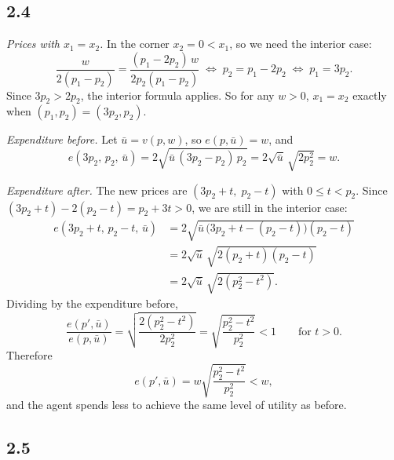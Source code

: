 \documentclass[12pt,letterpaper]{article}
\newif\ifshowhints
\newcommand{\hint}[1]{\ifshowhints{\color{blue}\small\textbf{Hint.} #1\par}\fi}
\begin{document}
\subsection*{2.4}

\textit{Prices with $x_1=x_2$.} In the corner $x_2=0<x_1$, so we need the interior case:
\[
\frac{w}{2(p_1-p_2)} = \frac{(p_1-2p_2)\,w}{2p_2(p_1-p_2)} \;\Longleftrightarrow\; p_2 = p_1-2p_2 \;\Longleftrightarrow\; p_1 = 3p_2 .
\]
Since $3p_2>2p_2$, the interior formula applies. So for any $w>0$, $x_1=x_2$ exactly when $(p_1,p_2)=(3p_2,p_2)$.

\textit{Expenditure before.} Let $\bar u = v(p,w)$, so $e(p,\bar u)=w$, and
\[
e(3p_2,\,p_2,\,\bar u) = 2\sqrt{\bar u\,(3p_2-p_2)\,p_2} = 2\sqrt{\bar u}\,\sqrt{2p_2^2} = w .
\]

\textit{Expenditure after.} The new prices are $(3p_2+t,\;p_2-t)$ with $0\le t<p_2$. Since $(3p_2+t)-2(p_2-t) = p_2+3t>0$, we are still in the interior case:
\begin{align*}
e(3p_2+t,\,p_2-t,\,\bar u) &= 2\sqrt{\bar u\,\big(3p_2+t-(p_2-t)\big)(p_2-t)}\\
&= 2\sqrt{\bar u}\,\sqrt{2(p_2+t)(p_2-t)}\\
&= 2\sqrt{\bar u}\,\sqrt{2(p_2^2-t^2)} .
\end{align*}
Dividing by the expenditure before,
\[
\frac{e(p',\bar u)}{e(p,\bar u)} = \sqrt{\frac{2(p_2^2-t^2)}{2p_2^2}} = \sqrt{\frac{p_2^2-t^2}{p_2^2}} < 1 \qquad \text{for } t>0 .
\]
Therefore
\[
e(p',\bar u) = w\sqrt{\frac{p_2^2-t^2}{p_2^2}} < w,
\]
and the agent spends less to achieve the same level of utility as before.

\subsection*{2.5}

\hint{Start at $p$ with $x_1(p,w)=x_2(p,w)$ and let $\bar u=v(p,w)$.
(i) Duality: with continuous, locally non-satiated preferences, $h(p,\bar u)=x(p,w)$ and $e(p,\bar u)=w$, so $h_1=h_2$ at $p$.
(ii) Envelope Theorem / Shephard's Lemma: differentiate $e(p_1+t,\,p_2-t,\,\bar u)$ with respect to $t$ at $t=0$. What do you get when $h_1=h_2$?
(iii) The expenditure function is concave in $p$, so it lies below its tangent. Combine with (ii).
(iv) Equivalently, without derivatives: is the old bundle still feasible in the EMP at the new prices, and what does it cost there?
(v) Ask whether you get $<$ or only $\le$. Does strict convexity alone guarantee the consumer changes his bundle?
(vi) Intuition: the old bundle costs the same at the new prices, but good 2 is now relatively cheaper (substitution effect).}
\end{document}
